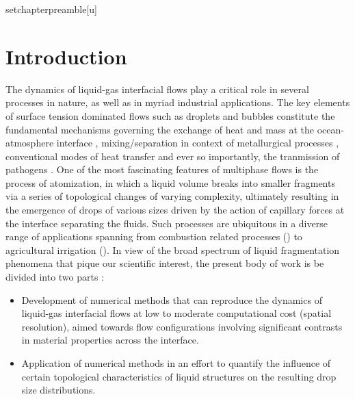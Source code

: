 setchapterpreamble[u]{\margintoc}
\chapter{Introduction} 


The dynamics of liquid-gas interfacial flows play a critical role in several processes in nature, 
as well as in myriad industrial applications. 
The key elements of surface tension dominated flows such as droplets and bubbles constitute the  
fundamental mechanisms governing the exchange of heat and mass at the ocean-atmosphere interface \cite{seinfeld1998air,deike}, 
mixing/separation in context of metallurgical processes \cite{johansen1988fluid,metal},  
conventional modes of heat transfer \cite{deckwer1980mechanism,bubble}
and ever so importantly, the tranmission of pathogens \cite{lydia_1,lydia_2}. 
One of the most fascinating features of multiphase flows is the process of atomization, 
in which a liquid volume breaks into smaller fragments via a series of topological 
changes of varying complexity, ultimately resulting in the emergence of drops of various sizes
driven by the action of capillary forces at the interface separating the fluids.  
Such processes are ubiquitous in a diverse range of applications spanning from combustion related processes 
(\cite{lefebvre2017atomization,bayvel1993liquid}) to agricultural irrigation (\cite{lake1977effect,reichenberger2007mitigation}).    
In view of the broad spectrum of liquid fragmentation phenomena that pique our scientific interest, 
the present body of work is be divided into two parts :  






\begin{itemize}
	\item Development of numerical methods that can reproduce the dynamics of liquid-gas interfacial flows
		at low to moderate computational cost (spatial resolution), aimed towards flow configurations 
		involving significant contrasts in material properties across the interface. 
	\item Application of numerical methods in an effort to quantify the influence of certain topological
		characteristics of liquid structures on the resulting drop size distributions.  
\end{itemize}


